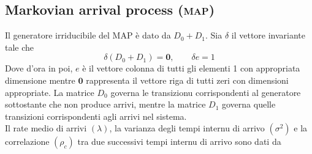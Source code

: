 \documentclass[11pt]{article}
\begin{document}
\subsection{Markovian arrival process (\textsc{map})}

Il generatore irriducibile del MAP è dato da $D_0 + D_1$. Sia $\delta$ il vettore invariante tale che
\begin{equation} \label{eq:invariant}
    \delta (D_0 + D_1) = \textbf{0}, \qquad \delta e = 1
\end{equation}
Dove d'ora in poi, $e$ è il vettore colonna di tutti gli elementi 1 con appropriata dimensione mentre $\textbf{0}$ rappresenta il vettore riga di tutti zeri con dimensioni appropriate. La matrice $D_0$ governa le transizionu corrispondenti al generatore sottostante che non produce arrivi, mentre la matrice  $D_1$ governa quelle transizioni corrispondenti agli arrivi nel sistema. \\

\noindent Il rate medio di arrivi $(\lambda)$, la varianza degli tempi internu di arrivo
$(\sigma^2)$ e la correlazione $(\rho_c)$ tra due successivi tempi internu di arrivo sono dati da
\end{document}
